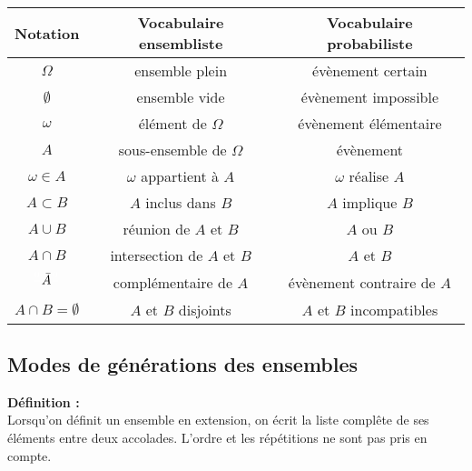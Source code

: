 \documentclass{article}
\begin{document}
\begin{tabular}{|c|c|c|}
	\hline
	Notation                                                                               & Vocabulaire ensembliste    & Vocabulaire probabiliste   \\
	\hline
	$\Omega$                                                                               & ensemble plein             & évènement certain          \\
	\hline
	$\emptyset$                                                                            & ensemble vide              & évènement impossible       \\
	\hline
	$\omega$                                                                               & élément de $\Omega$        & évènement élémentaire      \\
	\hline
	$A$                                                                                    & sous-ensemble de $\Omega$  & évènement                  \\
	\hline
	$\omega \in A$                                                                         & $\omega$ appartient à $A$  & $\omega$ réalise $A$       \\
	\hline
	$A \subset B$                                                                          & $A$ inclus dans $B$        & $A$ implique $B$           \\
	\hline
	$A \cup B$                                                                             & réunion de $A$ et $B$      & $A$ ou $B$                 \\
	\hline
	$A \cap B$                                                                             & intersection de $A$ et $B$ & $A$ et $B$                 \\
	\hline
	$\displaystyle \color{white}\frac{_0}{} \color{black}\bar{A} \color{white}\frac{_0}{}$ & complémentaire de $A$      & évènement contraire de $A$ \\
	\hline
	$A \cap B = \emptyset$                                                                 & $A$ et $B$ disjoints       & $A$ et $B$ incompatibles   \\
	\hline
\end{tabular}

\subsection{Modes de générations des ensembles}

\begin{mdframed}[style=definitionStyle]
	\textbf{Définition :} ~\\
	Lorsqu'on définit un ensemble en extension, on écrit la liste complête de ses éléments entre deux accolades. L'ordre et les répétitions ne sont pas pris en compte.
\end{mdframed}
\end{document}
